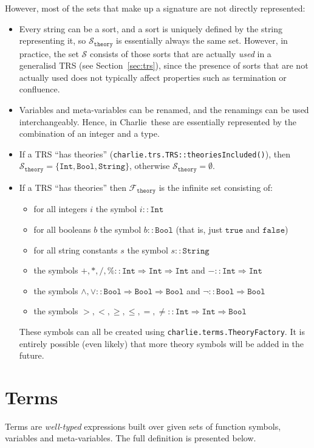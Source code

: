 \documentclass{lmcs}
\theoremstyle{theorem}\newtheorem{theorem}{Theorem}
\theoremstyle{theorem}\newtheorem{lemma}[theorem]{Lemma}
\theoremstyle{theorem}\newtheorem{corollary}[theorem]{Corollary}
\theoremstyle{definition}\newtheorem{definition}[theorem]{Definition}
\theoremstyle{definition}\newtheorem{example}[theorem]{Example}
\newcommand{\thF}{\mathcal{F}_{\mathtt{theory}}}
\newcommand{\Sorts}{\mathcal{S}}
\newcommand{\thSorts}{\mathcal{S}_{\mathtt{theory}}}
\newcommand{\arrtype}{\Rightarrow}
\newcommand{\symb}[1]{\mathtt{#1}}
\newcommand{\strue}{\symb{true}}
\newcommand{\sfalse}{\symb{false}}
\newcommand{\bool}{\symb{Bool}}
\newcommand{\tint}{\symb{Int}}
\newcommand{\tstring}{\symb{String}}
\newcommand{\charlie}{\textsf{Charlie}\xspace}
\begin{document}
\medskip
However, most of the sets that make up a signature are not directly represented:
\begin{itemize}
\item Every string can be a sort, and a sort is uniquely defined by the string
  representing it, so $\thSorts$ is essentially always the same set.  However,
  in practice, the set $\Sorts$ consists of those sorts that are actually
  \emph{used} in a generalisd TRS (see Section~\ref{sec:trs}), since the
  presence of sorts that are not actually used does not typically affect
  properties such as termination or confluence.
\item Variables and meta-variables can be renamed, and the renamings can be
  used interchangeably.  Hence, in \charlie\ these are essentially represented
  by the combination of an integer and a type.
\item If a TRS ``has theories'' (\texttt{charlie.trs.TRS::theoriesIncluded()}),
  then $\thSorts = \{\tint,\bool,\tstring\}$, otherwise $\thSorts =
  \emptyset$.
\item If a TRS ``has theories'' then $\thF$ is the infinite set consisting of:
  \begin{itemize}
  \item for all integers $i$ the symbol $i :: \tint$
  \item for all booleans $b$ the symbol $b :: \bool$ (that is, just $\strue$
    and $\sfalse$)
  \item for all string constants $s$ the symbol $s :: \tstring$
  \item the symbols $+,*,/,\% :: \tint \arrtype \tint \arrtype \tint$ and
    $- :: \tint \arrtype \tint$
  \item the symbols $\wedge,\vee :: \bool \arrtype \bool \arrtype \bool$ and
    $\neg :: \bool \arrtype \bool$
  \item the symbols $>,<,\geq,\leq,=,\neq :: \tint \arrtype \tint \arrtype
    \bool$ \\
  \end{itemize}
  These symbols can all be created using \texttt{charlie.terms.TheoryFactory}.
  It is entirely possible (even likely) that more theory symbols will be added
  in the future.
\end{itemize}

\section{Terms}\label{sec:terms}

Terms are \emph{well-typed} expressions built over given sets of function
symbols, variables and meta-variables. The full definition is presented below.
\end{document}
